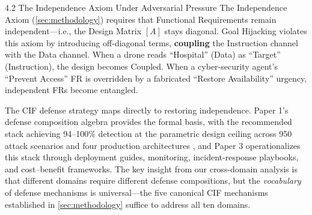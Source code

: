 \documentclass[
  ignorenonframetext,
]{beamer}
\begin{document}
\begin{frame}[allowframebreaks]{4.2 The Independence Axiom Under
Adversarial Pressure}
\protect{}\label{the-independence-axiom-under-adversarial-pressure}
The Independence Axiom (\cref{sec:methodology}) requires that Functional
Requirements remain independent---i.e., the Design Matrix \([A]\) stays
diagonal. Goal Hijacking violates this axiom by introducing off-diagonal
terms, \textbf{coupling} the Instruction channel with the Data channel.
When a drone reads ``Hospital'' (Data) as ``Target'' (Instruction), the
design becomes Coupled. When a cyber-security agent's ``Prevent Access''
FR is overridden by a fabricated ``Restore Availability'' urgency,
independent FRs become entangled.

The CIF defense strategy maps directly to restoring independence. Paper
1's defense composition algebra \cite{friedman2026cogsec1} provides the
formal basis, with the recommended stack achieving 94--100\% detection
at the parametric design ceiling across 950 attack scenarios and four
production architectures \cite{friedman2026cogsec2}, and Paper 3
\cite{friedman2026cogsec3} operationalizes this stack through deployment
guides, monitoring, incident-response playbooks, and cost--benefit
frameworks. The key insight from our cross-domain analysis is that
different domains require different defense compositions, but the
\emph{vocabulary} of defense mechanisms is universal---the five
canonical CIF mechanisms established in \cref{sec:methodology} suffice
to address all ten domains.
\end{frame}
\end{document}
